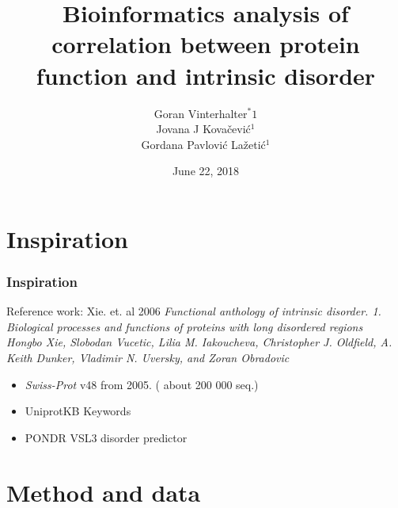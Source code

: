 \documentclass{beamer}
\title[Protein function and IDP \& IDPr]{ Bioinformatics analysis
of correlation between protein function and intrinsic disorder}
\author{
  Goran Vinterhalter$^*1$
  \\ Jovana J Kovačević$^1$
  \\ Gordana Pavlović Lažetić$^1$
}
\institute[Faculty of Mathematics]{
  University of Belgrade, Faculty of Mathematics$^1$
}
\date{June 22, 2018}
\newcommand{\swissprot}{\textit{Swiss-Prot} }
\begin{document}


\begin{frame}
  \titlepage
\end{frame}

\begin{frame}
\tableofcontents[]
\end{frame}

\section{Inspiration}
\begin{frame}
  \frametitle{Inspiration}

  \begin{block} {Reference work: Xie. et. al 2006}
    \textit{Functional anthology of intrinsic disorder. 1.\\
  \small Biological processes and functions of proteins with long disordered regions}
  \textit{
    \footnotesize
\\Hongbo Xie, Slobodan Vucetic, Lilia M. Iakoucheva, Christopher J. Oldfield,
A. Keith Dunker, Vladimir N. Uversky, and Zoran Obradovic
  }
  \end{block}

  \pause
  \begin{itemize}
    \item \swissprot v48 from 2005. ( about 200 000 seq.)
      \pause
    \item UniprotKB Keywords
      \pause

    \item PONDR VSL3 disorder predictor
  \end{itemize}

\end{frame}


\section{Method and data}
\end{document}
